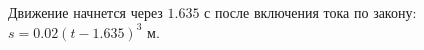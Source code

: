 Движение начнется через $1.635$ с после включения
тока по закону: $s=0.02\left(t-1.635\right)^3$ м.

